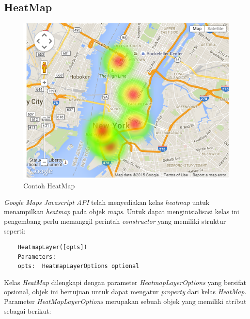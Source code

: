 \subsection{HeatMap}
\begin{figure}[H]
	\centering
	\includegraphics[scale=0.8]{Gambar/heat-map-example.png}
	\caption{Contoh HeatMap}
	\label{fig:my_label}
\end{figure}

\textit{Google Maps Javascript API} telah menyediakan kelas \textit{heatmap} untuk menampilkan \textit{heatmap} pada objek \textit{maps}. Untuk dapat menginisialisasi kelas ini pengembang perlu memanggil perintah \textit{constructor} yang memiliki struktur seperti:
\begin{lstlisting}
    HeatmapLayer([opts])
    Parameters: 
    opts:  HeatmapLayerOptions optional
\end{lstlisting}
Kelas \textit{HeatMap} dilengkapi dengan parameter \textit{HeatmapLayerOptions} yang bersifat opsional, objek ini  bertujuan untuk dapat mengatur \textit{property} dari kelas \textit{HeatMap}. Parameter \textit{HeatMapLayerOptions} merupakan sebuah objek yang memiliki atribut sebagai berikut:

